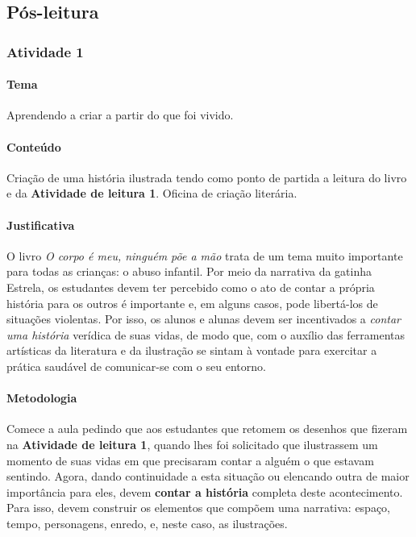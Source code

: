 \documentclass[11pt]{extarticle}
\begin{document}
\subsection{Pós-leitura}

\subsubsection{Atividade 1}

\paragraph{Tema} Aprendendo a criar a partir do que foi vivido. 

\paragraph{Conteúdo} Criação de uma história ilustrada tendo como 
ponto de partida a leitura do livro e da \textbf{Atividade de leitura 1}. 
Oficina de criação literária.

\paragraph{Justificativa} O livro \textit{O corpo é meu, ninguém põe a mão}
trata de um tema muito importante para todas as crianças: o abuso infantil. Por meio da narrativa da gatinha Estrela, 
os estudantes devem ter percebido como o ato de contar a própria história para os outros é 
importante e, em alguns casos, pode libertá-los de situações violentas. 
Por isso, os alunos e alunas devem ser incentivados a \textit{contar uma história}
verídica de suas vidas, de modo que, com o auxílio das ferramentas artísticas
da literatura e da ilustração se sintam à vontade para exercitar a prática saudável de 
comunicar-se com o seu entorno. 

\paragraph{Metodologia} Comece a aula pedindo que aos estudantes que retomem os desenhos que fizeram
na \textbf{Atividade de leitura 1}, quando lhes foi solicitado que ilustrassem um momento de suas vidas em que 
precisaram contar a alguém o que estavam sentindo. 
Agora, dando continuidade a esta situação ou elencando outra de maior importância para eles,
devem \textbf{contar a história} completa deste acontecimento. Para isso, devem 
construir os elementos que compõem uma narrativa: espaço, tempo, personagens, enredo, e,
neste caso, as ilustrações. 
\end{document}
